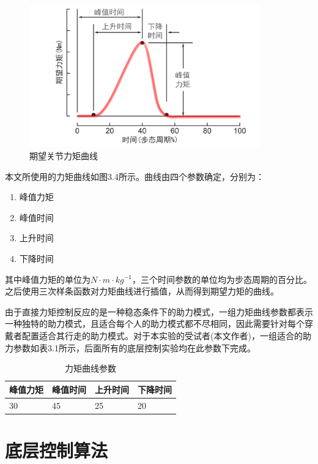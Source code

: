 \begin{figure}[htb]
    \includegraphics[width=10cm]{fig/f51.png}
    \caption{期望关节力矩曲线}
    \label{fig:mark}
\end{figure}

本文所使用的力矩曲线如图3.4所示。曲线由四个参数确定，分别为：
\begin{enumerate}
    \item 峰值力矩
    \item 峰值时间
    \item 上升时间
    \item 下降时间
\end{enumerate}
其中峰值力矩的单位为$N\cdot m \cdot kg^{-1}$，三个时间参数的单位均为步态周期的百分比。之后使用三次样条函数对力矩曲线进行插值，从而得到期望力矩的曲线。

由于直接力矩控制反应的是一种稳态条件下的助力模式，一组力矩曲线参数都表示一种独特的助力模式，且适合每个人的助力模式都不尽相同，因此需要针对每个穿戴者配置适合其行走的助力模式。对于本实验的受试者(本文作者)，一组适合的助力参数如表3.1所示，后面所有的底层控制实验均在此参数下完成。

\begin{table}[htb]
    \caption[力矩曲线]{力矩曲线参数}
    \begin{tabular}{llll}
      \toprule
        峰值力矩 & 峰值时间 & 上升时间 & 下降时间 \\
      \midrule
        30 & 45 & 25 & 20 \\
      \bottomrule
    \end{tabular}
\end{table}

\section{底层控制算法}
                                                                                        
